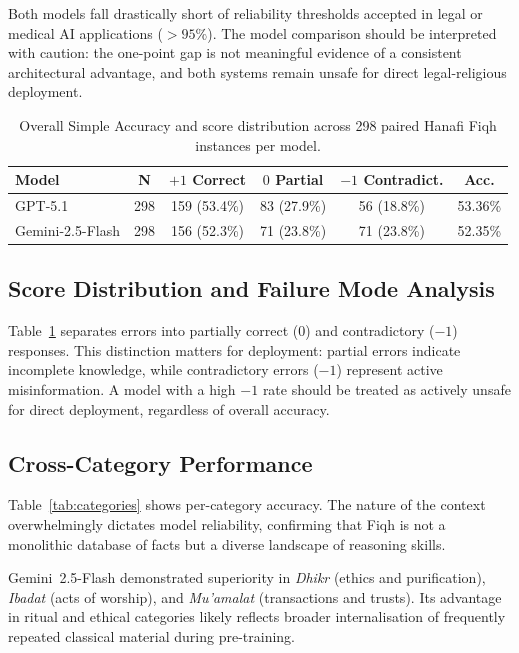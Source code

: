 \documentclass[runningheads]{llncs}
\begin{document}
Both models fall drastically short of reliability thresholds accepted in legal or medical AI applications ($>95\%$). The model comparison should be interpreted with caution: the one-point gap is not meaningful evidence of a consistent architectural advantage, and both systems remain unsafe for direct legal-religious deployment.

\begin{table}[t]
\centering
\caption{Overall Simple Accuracy and score distribution across 298 paired Hanafi Fiqh instances per model.}
\label{tab:overall}
\setlength{\tabcolsep}{4pt}
\footnotesize
\begin{tabular}{lccccc}
\toprule
\textbf{Model} & \textbf{N} & \textbf{$+1$ Correct} & \textbf{$0$ Partial} & \textbf{$-1$ Contradict.} & \textbf{Acc.} \\
\midrule
GPT-5.1          & 298 & 159 (53.4\%) & 83 (27.9\%) & 56 (18.8\%) & 53.36\% \\
Gemini-2.5-Flash & 298 & 156 (52.3\%) & 71 (23.8\%) & 71 (23.8\%) & 52.35\% \\
\bottomrule
\end{tabular}
\end{table}

\subsection{Score Distribution and Failure Mode Analysis}
Table~\ref{tab:overall} separates errors into partially correct ($0$) and contradictory ($-1$) responses. This distinction matters for deployment: partial errors indicate incomplete knowledge, while contradictory errors ($-1$) represent active misinformation. A model with a high $-1$ rate should be treated as actively unsafe for direct deployment, regardless of overall accuracy.

\subsection{Cross-Category Performance}
Table~\ref{tab:categories} shows per-category accuracy. The nature of the context overwhelmingly dictates model reliability, confirming that Fiqh is not a monolithic database of facts but a diverse landscape of reasoning skills.

Gemini~2.5-Flash demonstrated superiority in \textit{Dhikr} (ethics and purification), \textit{Ibadat} (acts of worship), and \textit{Mu'amalat} (transactions and trusts). Its advantage in ritual and ethical categories likely reflects broader internalisation of frequently repeated classical material during pre-training.
\end{document}
